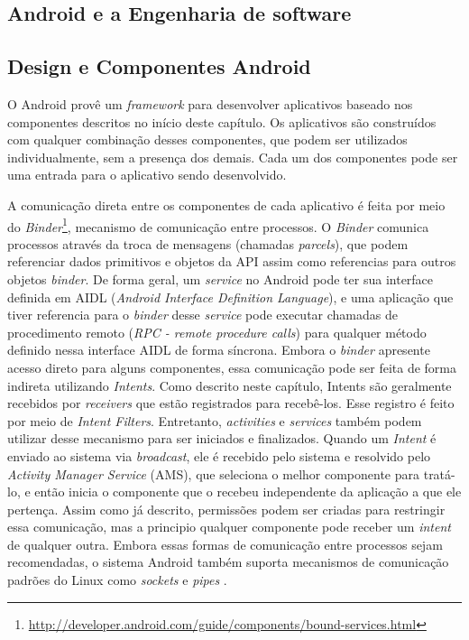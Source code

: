 \begin{apendicesenv}

\partapendices

\chapter{Android e a Engenharia de software}
\label{ap:android_esw}

\section{Design e Componentes Android}

O Android provê um \textit{framework} para desenvolver aplicativos baseado nos componentes descritos no início deste capítulo. Os aplicativos são construídos com qualquer combinação desses componentes, que podem ser utilizados individualmente, sem a presença dos demais. Cada um dos componentes pode ser uma entrada para o aplicativo sendo desenvolvido.

A comunicação direta entre os componentes de cada aplicativo é feita por meio do \textit{Binder}\footnote{\url{http://developer.android.com/guide/components/bound-services.html}}, mecanismo de comunicação entre processos. O \textit{Binder} comunica processos através da troca de mensagens (chamadas \textit{parcels}), que podem referenciar dados primitivos e objetos da API assim como referencias para outros objetos \textit{binder}. De forma geral, um \textit{service} no Android pode ter sua interface definida em AIDL (\textit{Android Interface Definition Language}), e uma aplicação que tiver referencia para o \textit{binder} desse \textit{service} pode executar chamadas de procedimento remoto (\textit{RPC - remote procedure calls}) para qualquer método definido nessa interface AIDL de forma síncrona. Embora o \textit{binder} apresente acesso direto para alguns componentes, essa comunicação pode ser feita de forma indireta utilizando \textit{Intents}. Como descrito neste capítulo, Intents são geralmente recebidos por \textit{receivers} que estão registrados para recebê-los. Esse registro é feito por meio de \textit{Intent Filters}. Entretanto, \textit{activities} e \textit{services} também podem utilizar desse mecanismo para ser iniciados e finalizados. Quando um \textit{Intent} é enviado ao sistema via \textit{broadcast}, ele é recebido pelo sistema e resolvido pelo \textit{Activity Manager Service} (AMS), que seleciona o melhor componente para tratá-lo, e então inicia o componente que o recebeu independente da aplicação a que ele pertença. Assim como já descrito, permissões podem ser criadas para restringir essa comunicação, mas a principio qualquer componente pode receber um \textit{intent} de qualquer outra.  Embora essas formas de comunicação entre processos sejam recomendadas, o sistema Android também suporta mecanismos de comunicação padrões do Linux como \textit{sockets} e \textit{pipes} \cite{heuser2014}.


\end{apendicesenv}
